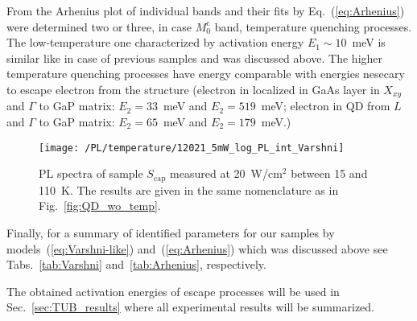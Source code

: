 From the Arhenius plot of individual bands and their fits by Eq.~(\ref{eq:Arhenius}) were determined two or three, in case $M_0^\mathrm{c}$ band, temperature quenching processes. The low-temperature one characterized by activation energy $E_1\sim 10$~meV is similar like in case of previous samples and was discussed above. The higher temperature quenching processes have energy comparable with energies nesecary to escape electron from the structure (electron in localized in GaAs layer in $X_{xy}$ and $\Gamma$ to GaP matrix: $E_2=33$~meV and $E_2=519$~meV; electron in QD from $L$ and $\Gamma$ to GaP matrix: $E_2=65$~meV and $E_2=179$~meV.)

%
\begin{figure}[h]
	\centering
	\texttt{[image: /PL/temperature/12021\_5mW\_log\_PL\_int\_Varshni]}
	\caption{PL spectra of sample ${S_\mathrm{cap}}$ measured at 20~W/cm$^2$ between 15 and 110~K. The results are given in the same nomenclature as in Fig.~\ref{fig:QD_wo_temp}.}
	\label{fig:QD_c_temp}
\end{figure}


%



Finally, for a summary of identified parameters for our samples by models~(\ref{eq:Varshni-like}) and~(\ref{eq:Arhenius}) which was discussed above see Tabs.~\ref{tab:Varshni} and~\ref{tab:Arhenius}, respectively. 

The obtained activation energies of escape processes will be used in Sec.~\ref{sec:TUB_results} where all experimental results will be summarized.




